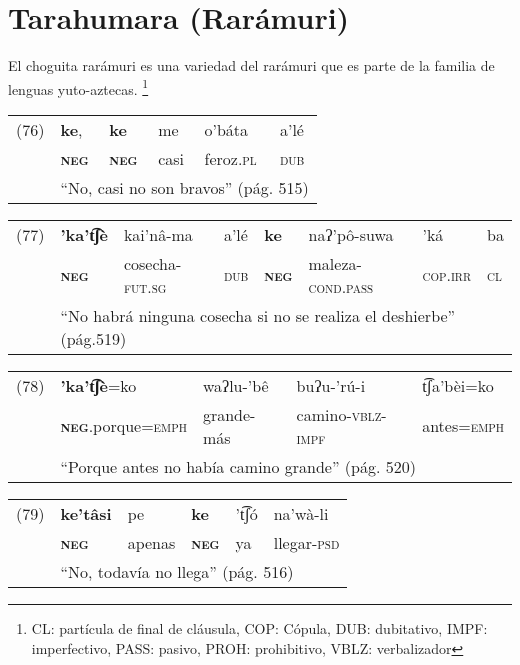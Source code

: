 \section*{Tarahumara (Rarámuri)}

\noindent El choguita rarámuri es una variedad del rarámuri que es parte de la familia de lenguas yuto-aztecas.
\footnote{CL: partícula de final de cláusula, COP: Cópula, DUB: dubitativo, IMPF: imperfectivo, PASS: pasivo, PROH: prohibitivo, VBLZ: verbalizador}
\vspace{0.5cm}

{\setmainfont{Charis SIL} 

\begin{tabular}{llllll}
(76) & \textbf{ke}, & \textbf{ke} & me & o'báta & a'lé \\
& \textsc{\textbf{neg}} & \textsc{\textbf{neg}} & casi & feroz.\textsc{pl} & \textsc{dub}\\
& \multicolumn{5}{l}{``No, casi no son bravos'' (pág. 515)}
\end{tabular} \vspace{0.5cm}

\begin{tabular}{llllllll}
(77) & \textbf{'ka't͡ʃè} & kai'nâ-ma & a'lé & \textbf{ke} & naʔ'pô-suwa & 'ká & ba \\
& \textsc{\textbf{neg}} & cosecha-\textsc{fut.sg} & \textsc{dub} & \textsc{\textbf{neg}} & maleza-\textsc{cond.pass} & \textsc{cop.irr} & \textsc{cl} \\
& \multicolumn{7}{l}{``No habrá ninguna cosecha si no se realiza el deshierbe'' (pág.519)}
\end{tabular} \vspace{0.5cm}

\begin{tabular}{lllll}
(78) & \textbf{'ka't͡ʃè}=ko & waʔlu-'bê & buʔu-'rú-i & t͡ʃa'bèi=ko  \\
& \textsc{\textbf{neg}}.porque=\textsc{emph} & grande-más & camino-\textsc{vblz-impf} & antes=\textsc{emph} \\
& \multicolumn{4}{l}{``Porque antes no había camino grande'' (pág. 520)}
\end{tabular} \vspace{0.5cm}

\begin{tabular}{llllll}
(79) & \textbf{ke'tâsi} & pe & \textbf{ke} & 't͡ʃó & na'wà-li \\
& \textsc{\textbf{neg}} & apenas & \textsc{\textbf{neg}} & ya & llegar-\textsc{psd} \\
& \multicolumn{5}{l}{``No, todavía no llega'' (pág. 516)}
\end{tabular} \vspace{0.5cm}

}
